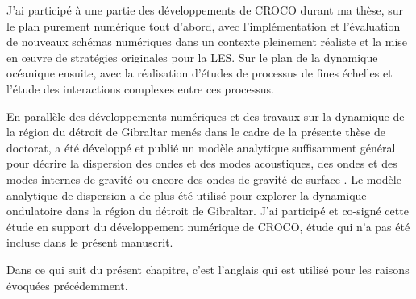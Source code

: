 
J'ai participé à une partie des développements de CROCO durant ma thèse, sur le plan purement numérique tout d'abord, avec l'implémentation et l'évaluation de nouveaux schémas numériques dans un contexte pleinement réaliste et la mise en œuvre de stratégies originales pour la LES. Sur le plan de la dynamique océanique ensuite, avec la réalisation d'études de processus de fines échelles et l'étude des interactions complexes entre ces processus.


En parallèle des développements numériques et des travaux sur la dynamique de la région du détroit de Gibraltar menés dans le cadre de la présente thèse de doctorat, a été développé et publié un modèle analytique suffisamment général pour décrire la dispersion des ondes et des modes acoustiques, des ondes et des modes internes de gravité ou encore des ondes de gravité de surface \citep{auclair_modied_2021}. Le modèle analytique de dispersion a de plus été utilisé pour explorer la dynamique ondulatoire dans la région du détroit de Gibraltar.
J'ai participé et co-signé cette étude en support du développement numérique de CROCO, étude qui n'a pas été incluse dans le présent manuscrit.

Dans ce qui suit du présent chapitre, c'est l'anglais qui est utilisé pour les raisons évoquées précédemment.




